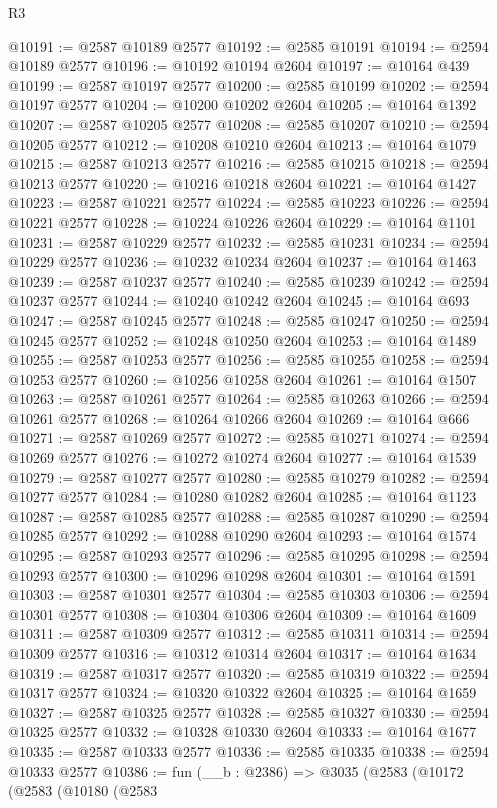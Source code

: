 \begin{lexlean}{R3}
\begin{coremodule}
@10191 := @2587 @10189 @2577
@10192 := @2585 @10191
@10194 := @2594 @10189 @2577
@10196 := @10192 @10194 @2604
@10197 := @10164 @439
@10199 := @2587 @10197 @2577
@10200 := @2585 @10199
@10202 := @2594 @10197 @2577
@10204 := @10200 @10202 @2604
@10205 := @10164 @1392
@10207 := @2587 @10205 @2577
@10208 := @2585 @10207
@10210 := @2594 @10205 @2577
@10212 := @10208 @10210 @2604
@10213 := @10164 @1079
@10215 := @2587 @10213 @2577
@10216 := @2585 @10215
@10218 := @2594 @10213 @2577
@10220 := @10216 @10218 @2604
@10221 := @10164 @1427
@10223 := @2587 @10221 @2577
@10224 := @2585 @10223
@10226 := @2594 @10221 @2577
@10228 := @10224 @10226 @2604
@10229 := @10164 @1101
@10231 := @2587 @10229 @2577
@10232 := @2585 @10231
@10234 := @2594 @10229 @2577
@10236 := @10232 @10234 @2604
@10237 := @10164 @1463
@10239 := @2587 @10237 @2577
@10240 := @2585 @10239
@10242 := @2594 @10237 @2577
@10244 := @10240 @10242 @2604
@10245 := @10164 @693
@10247 := @2587 @10245 @2577
@10248 := @2585 @10247
@10250 := @2594 @10245 @2577
@10252 := @10248 @10250 @2604
@10253 := @10164 @1489
@10255 := @2587 @10253 @2577
@10256 := @2585 @10255
@10258 := @2594 @10253 @2577
@10260 := @10256 @10258 @2604
@10261 := @10164 @1507
@10263 := @2587 @10261 @2577
@10264 := @2585 @10263
@10266 := @2594 @10261 @2577
@10268 := @10264 @10266 @2604
@10269 := @10164 @666
@10271 := @2587 @10269 @2577
@10272 := @2585 @10271
@10274 := @2594 @10269 @2577
@10276 := @10272 @10274 @2604
@10277 := @10164 @1539
@10279 := @2587 @10277 @2577
@10280 := @2585 @10279
@10282 := @2594 @10277 @2577
@10284 := @10280 @10282 @2604
@10285 := @10164 @1123
@10287 := @2587 @10285 @2577
@10288 := @2585 @10287
@10290 := @2594 @10285 @2577
@10292 := @10288 @10290 @2604
@10293 := @10164 @1574
@10295 := @2587 @10293 @2577
@10296 := @2585 @10295
@10298 := @2594 @10293 @2577
@10300 := @10296 @10298 @2604
@10301 := @10164 @1591
@10303 := @2587 @10301 @2577
@10304 := @2585 @10303
@10306 := @2594 @10301 @2577
@10308 := @10304 @10306 @2604
@10309 := @10164 @1609
@10311 := @2587 @10309 @2577
@10312 := @2585 @10311
@10314 := @2594 @10309 @2577
@10316 := @10312 @10314 @2604
@10317 := @10164 @1634
@10319 := @2587 @10317 @2577
@10320 := @2585 @10319
@10322 := @2594 @10317 @2577
@10324 := @10320 @10322 @2604
@10325 := @10164 @1659
@10327 := @2587 @10325 @2577
@10328 := @2585 @10327
@10330 := @2594 @10325 @2577
@10332 := @10328 @10330 @2604
@10333 := @10164 @1677
@10335 := @2587 @10333 @2577
@10336 := @2585 @10335
@10338 := @2594 @10333 @2577
@10386 := fun (__b : @2386) =>
  @3035
    (@2583
      (@10172
        (@2583
          (@10180
            (@2583

\end{coremodule}
\end{lexlean}
